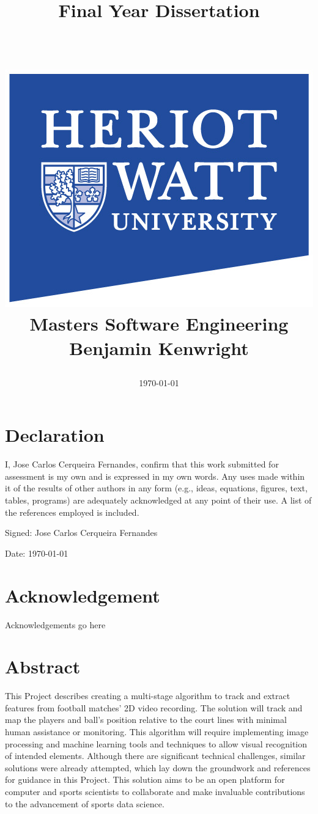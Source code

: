 \documentclass[
    11pt,
    oneside
]{report}
\title{
{\ThesisTitle}\\
\hfill \\
{\large Final Year Dissertation}\\
{\large \TheAuthor} \\
\hfill \\
{\includegraphics[scale=2.5]{hw.jpg}} \\
{\large Masters Software Engineering} \\
{\large Benjamin Kenwright} \\
\date{\today}
}
\newcommand{\TheAuthor}{Jose Carlos Cerqueira Fernandes}
\begin{document}
\maketitle



\chapter*{Declaration}
\thispagestyle{empty}

I, \TheAuthor, confirm that this work submitted for assessment is my own and is expressed in my own words. Any uses made within it of the results of other authors in any form (e.g., ideas, equations, figures, text, tables, programs) are adequately acknowledged at any point of their use. A list of the references employed is included.

\hfill


Signed: \TheAuthor


Date: \today

\chapter*{Acknowledgement}
\thispagestyle{empty}


Acknowledgements go here






\chapter*{Abstract}
\thispagestyle{empty}

This Project describes creating a multi-stage algorithm to track and extract features from football matches' 2D video recording. The solution will track and map the players and ball's position relative to the court lines with minimal human assistance or monitoring. This algorithm will require implementing image processing and machine learning tools and techniques to allow visual recognition of intended elements. Although there are significant technical challenges, similar solutions were already attempted, which lay down the groundwork and references for guidance in this Project. This solution aims to be an open platform for computer and sports scientists to collaborate and make invaluable contributions to the advancement of sports data science.



\setcounter{page}{0}

\tableofcontents
\end{document}
